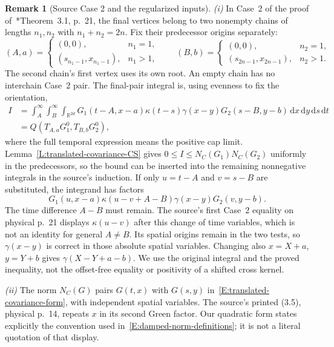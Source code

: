 \documentclass[12pt,oneside,openany]{book}
\numberwithin{equation}{section}
\theoremstyle{nogostyle}
\theoremstyle{definition}
\newtheorem{remark}[theorem]{Remark}
\newcommand{\R}{\mathbb{R}}
\newcommand{\ud}{\,\mathrm{d}}
\begin{document}
\begin{remark}[Source Case 2 and the regularized inputs]
  \label{R:source-case2-time-shift}
  \emph{(i)} In Case~2 of the proof
  of~\cite{chen:author2026:time-dependency}*{Theorem~3.1, p.~21}, the final
  vertices belong to two nonempty chains of lengths $n_1,n_2$ with $n_1+n_2 =
  2n$. Fix their predecessor origins separately:
  \[
    (A,a)=
    \begin{cases}
      (0,0),&n_1=1,\\
      (s_{n_1-1},x_{n_1-1}),&n_1>1,
    \end{cases}
    \qquad
    (B,b)=
    \begin{cases}
      (0,0),&n_2=1,\\
      (s_{2n-1},x_{2n-1}),&n_2>1.
    \end{cases}
  \]
  The second chain's first vertex uses its own root. An empty chain has no
  interchain Case~2 pair. The final-pair integral is, using evenness to fix the
  orientation,
  \[
    \begin{split}
      I&=\int_A^\infty\int_B^\infty\int_{\R^{2d}}
      G_1(t-A,x-a)\kappa(t-s)\gamma(x-y)G_2(s-B,y-b)
      \ud x\ud y\ud s\ud t\\
      &=Q(T_{A,a}G_1^0,T_{B,b}G_2^0),
    \end{split}
  \]
  where the full temporal expression means the positive cap limit.
  Lemma~\ref{L:translated-covariance-CS} gives $0 \le I \le N_C(G_1)N_C(G_2)$
  uniformly in the predecessors, so the bound can be inserted into the remaining
  nonnegative integrals in the source's induction. If only $u = t-A$ and $v =
  s-B$ are substituted, the integrand has factors
  \begin{equation}\label{E:translated-covariance-offset}
    G_1(u,x-a)\kappa(u-v+A-B)\gamma(x-y)G_2(v,y-b).
  \end{equation}
  The time difference $A-B$ must remain. The source's first Case~2 equality on
  physical p.~21 displays $\kappa(u-v)$ after this change of time variables,
  which is not an identity for general $A \ne B$. Its spatial origins remain in
  the two tests, so $\gamma(x-y)$ is correct in those absolute spatial
  variables. Changing also $x = X+a$, $y = Y+b$ gives $\gamma(X-Y+a-b)$. We use
  the original integral and the proved inequality, not the offset-free equality
  or positivity of a shifted cross kernel.

  \emph{(ii)} The norm $N_C(G)$ pairs $G(t,x)$ with $G(s,y)$
  in~\eqref{E:translated-covariance-form}, with independent spatial variables.
  The source's printed (3.5), physical p.~14, repeats $x$ in its second Green
  factor. Our quadratic form states explicitly the convention used
  in~\eqref{E:damped-norm-definitions}; it is not a literal quotation of that
  display.


\end{remark}
\end{document}
